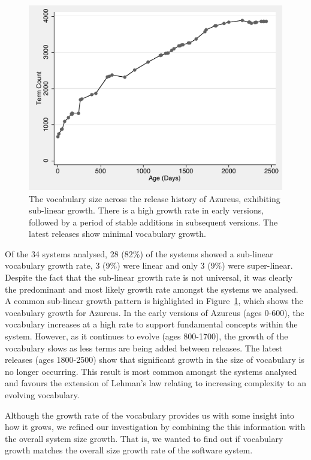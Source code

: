 \begin{figure}[t]
\centering
\includegraphics[width=\textwidth]{Figures/Vocab-AzureusGrowth.pdf}
\caption{The vocabulary size across the release history of Azureus, exhibiting sub-linear growth. There is a high growth rate in early versions, followed by a period of stable additions in subsequent versions. The latest releases show minimal vocabulary growth.}
\label{fig:vocab-growth-azureus}
\end{figure}

Of the 34 systems analysed, 28 (82\%) of the systems showed a sub-linear vocabulary growth rate, 3 (9\%) were linear and only 3 (9\%) were super-linear. Despite the fact that the sub-linear growth rate is not universal, it was clearly the predominant and most likely growth rate amongst the systems we analysed. A common sub-linear growth pattern is highlighted in Figure~\ref{fig:vocab-growth-azureus}, which shows the vocabulary growth for Azureus. In the early versions of Azureus (ages 0-600), the vocabulary increases at a high rate to support fundamental concepts within the system. However, as it continues to evolve (ages 800-1700), the growth of the vocabulary slows as less terms are being added between releases. The latest releases (ages 1800-2500) show that significant growth in the size of vocabulary is no longer occurring. This result is most common amongst the systems analysed and favours the extension of Lehman's law relating to increasing complexity to an evolving vocabulary.

Although the growth rate of the vocabulary provides us with some insight into how it grows,
we refined our investigation by combining the this information with the overall system size growth. That is, we wanted to find out if vocabulary growth matches the overall size growth rate of the software system.

